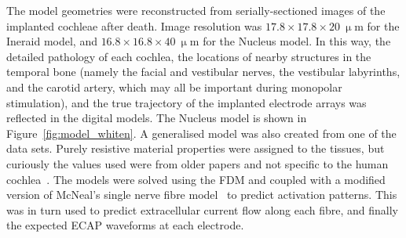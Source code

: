 The model geometries were reconstructed from serially-sectioned images of the
implanted cochleae after death. Image resolution was $ 17.8 \times 17.8 \times
20~\upmu $m for the Ineraid model, and $ 16.8 \times 16.8 \times 40~\upmu $m for
the Nucleus model. In this way, the detailed pathology of each cochlea, the
locations of nearby structures in the temporal bone (namely the facial and
vestibular nerves, the vestibular labyrinths, and the carotid artery, which may
all be important during monopolar stimulation), and the true trajectory of the
implanted electrode arrays was reflected in the digital models. The Nucleus
model is shown in Figure~\ref{fig:model_whiten}. A generalised model was also
created from one of the data sets. Purely resistive material properties were
assigned to the tissues, but curiously the values used were from older papers
and not specific to the human cochlea~\cite{geddes1967,peterson1978}. The models
were solved using the FDM and coupled with a modified version of McNeal's single
nerve fibre model~\cite{mcneal1976} to predict activation patterns. This was in
turn used to predict extracellular current flow along each fibre, and finally
the expected ECAP waveforms at each electrode.

